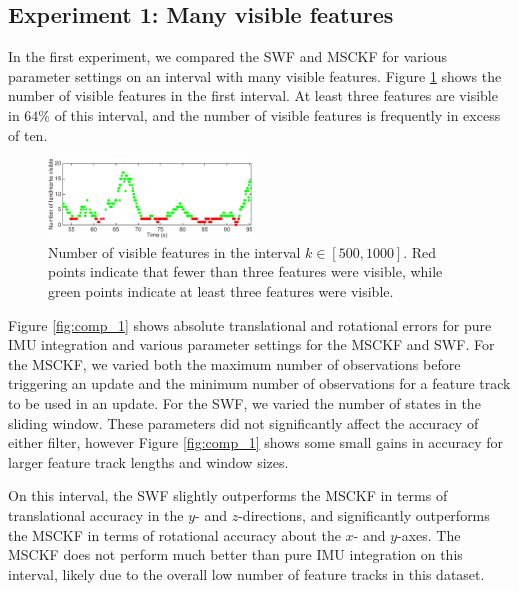 \documentclass[letterpaper, 10 pt, conference]{ieeeconf}  %
\begin{document}
\subsection{Experiment 1: Many visible features}
In the first experiment, we compared the SWF and MSCKF for various parameter settings on an interval with many visible features.
Figure \ref{fig:nVisible_int1} shows the number of visible features in the first interval.
At least three features are visible in $64\%$ of this interval, and the number of visible features is frequently in excess of ten.

\begin{figure}
    \centering
    \includegraphics[width=0.48\textwidth]{figs/nVisible_500_1000}
    \caption{Number of visible features in the interval $k\in[500,1000]$. Red points indicate that fewer than three features were visible, while green points indicate at least three features were visible.}
    \label{fig:nVisible_int1}
\end{figure}

Figure \ref{fig:comp_1} shows absolute translational and rotational errors for pure IMU integration and various parameter settings for the MSCKF and SWF.
For the MSCKF, we varied both the maximum number of observations before triggering an update and the minimum number of observations for a feature track to be used in an update.
For the SWF, we varied the number of states in the sliding window.
These parameters did not significantly affect the accuracy of either filter, however Figure \ref{fig:comp_1} shows some small gains in accuracy for larger feature track lengths and window sizes.

On this interval, the SWF slightly outperforms the MSCKF in terms of translational accuracy in the $y$- and $z$-directions, and significantly outperforms the MSCKF in terms of rotational accuracy about the $x$- and $y$-axes.
The MSCKF does not perform much better than pure IMU integration on this interval, likely due to the overall low number of feature tracks in this dataset.
\end{document}
